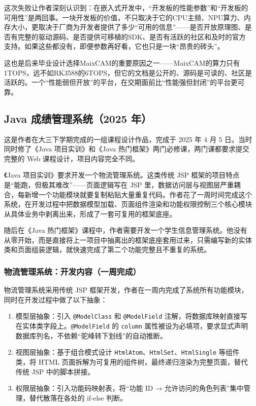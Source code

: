 这次失败让作者深刻认识到：在嵌入式开发中，“开发板的性能参数”和“开发板的可用性”是两回事。一块开发板的价值，不只取决于它的CPU主频、NPU算力、内存大小，更取决于厂商为开发者提供了多少“可用的信息”——是否开放原理图、是否有完整的驱动源码、是否提供可移植的SDK、是否有活跃的社区和及时的官方支持。如果这些都没有，即便参数再好看，它也只是一块“昂贵的砖头”。

这也是后来毕业设计选择MaixCAM的重要原因之一——MaixCAM的算力只有1TOPS，远不如RK3588的6TOPS，但它的文档是公开的、源码是可读的、社区是活跃的。一个“性能弱但开放”的平台，在交期面前比“性能强但封闭”的平台更可靠。

\subsection{Java 成绩管理系统（2025 年）}

这是作者在大三下学期完成的一组课程设计作品，完成于 2025 年 4 月 5 日。当时同时修了《Java 项目实训》和《Java 热门框架》两门必修课，两门课都要求提交完整的 Web 课程设计，项目内容完全不同。

《Java 项目实训》要求开发一个物流管理系统。这类传统 JSP 框架的项目特点是“能跑，但极其难改”——页面逻辑写在 JSP 里，数据访问层与视图层严重耦合，每新增一个功能模块就要复制粘贴大量重复代码。作者花了一周时间完成这个系统，在开发过程中把数据模型加载、页面组件渲染和功能权限控制三个核心模块从具体业务中剥离出来，形成了一套可复用的框架底座。

随后在《Java 热门框架》课程中，作者需要开发一个学生信息管理系统。他没有从零开始，而是直接将上一项目中抽离出的框架底座套用过来，只需编写新的实体类和页面组装逻辑，就快速完成了第二个功能完整且不重复的系统。

\subsubsection{物流管理系统：开发内容（一周完成）}

物流管理系统采用传统 JSP 框架开发，作者在一周内完成了系统所有功能模块，同时在开发过程中做了以下抽象：

\begin{enumerate}
	\item 模型层抽象：引入 \texttt{@ModelClass} 和 \texttt{@ModelField} 注解，将数据库映射直接写在实体类字段上。\texttt{@ModelField} 的 \texttt{column} 属性被设为必填项，要求显式声明数据库列名，不依赖“驼峰转下划线”的自动推断。
	
	\item 视图层抽象：基于组合模式设计 \texttt{HtmlAtom}、\texttt{HtmlSet}、\texttt{HtmlSingle} 等组件类，将 HTML 页面拆解为可复用的组件树，最终递归渲染为完整页面，替代传统 JSP 中的脚本拼接。
	
	\item 权限层抽象：引入功能码映射表，将“功能 ID → 允许访问的角色列表”集中管理，替代散落在各处的 if-else 判断。
\end{enumerate}

